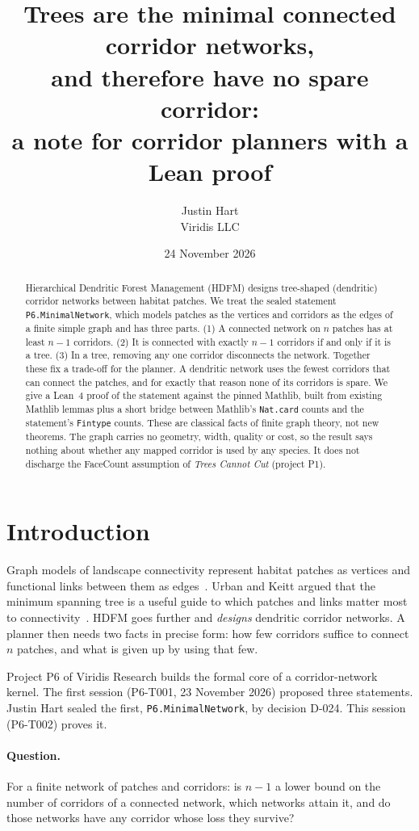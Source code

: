 \documentclass[11pt]{article}
\title{Trees are the minimal connected corridor networks,\\ and therefore have no spare corridor:\\ a note for corridor planners with a Lean proof}
\author{Justin Hart\\Viridis LLC}
\date{24 November 2026}
\begin{document}
\maketitle

\begin{abstract}
Hierarchical Dendritic Forest Management (HDFM) designs tree-shaped (dendritic) corridor networks
between habitat patches. We treat the sealed statement \texttt{P6.MinimalNetwork}, which models patches as the
vertices and corridors as the edges of a finite simple graph and has three parts.
(1) A connected network on $n$ patches has at least $n-1$ corridors.
(2) It is connected with exactly $n-1$ corridors if and only if it is a tree.
(3) In a tree, removing any one corridor disconnects the network.
Together these fix a trade-off for the planner. A dendritic network uses the fewest corridors that can
connect the patches, and for exactly that reason none of its corridors is spare. We give a Lean~4 proof
of the statement against the pinned Mathlib, built from existing Mathlib lemmas plus a short bridge between
Mathlib's \texttt{Nat.card} counts and the statement's \texttt{Fintype} counts. These are classical facts
of finite graph theory, not new theorems. The graph carries no geometry, width, quality or cost, so the
result says nothing about whether any mapped corridor is used by any species. It does not discharge the
FaceCount assumption of \emph{Trees Cannot Cut} (project P1).
\end{abstract}

\section{Introduction}
Graph models of landscape connectivity represent habitat patches as vertices and functional
links between them as edges~\citep{urbankeitt2001}. Urban and Keitt argued that the minimum spanning
tree is a useful guide to which patches and links matter most to connectivity~\citep{urbankeitt2001}.
HDFM goes further and \emph{designs} dendritic corridor networks. A planner then needs two facts in
precise form: how few corridors suffice to connect $n$ patches, and what is given up by using that few.

Project P6 of Viridis Research builds the formal core of a corridor-network kernel. The first session
(P6-T001, 23 November 2026) proposed three statements. Justin Hart sealed the first,
\texttt{P6.MinimalNetwork}, by decision D-024. This session (P6-T002) proves it.

\paragraph{Question.} For a finite network of patches and corridors: is $n-1$ a lower bound on the
number of corridors of a connected network, which networks attain it, and do those networks have
any corridor whose loss they survive?
\end{document}
